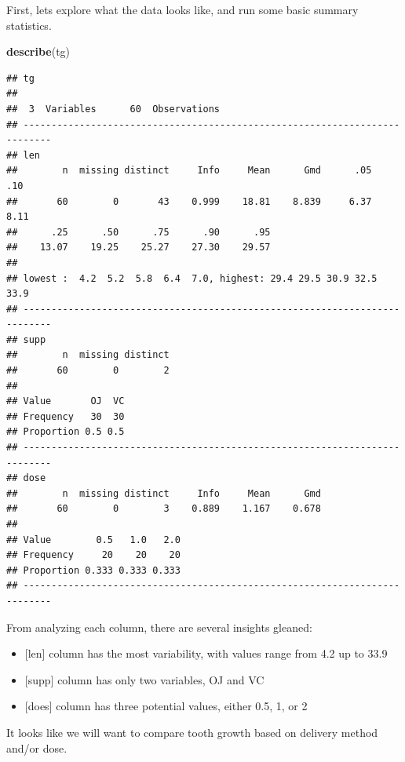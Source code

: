 \documentclass[]{article}
\newenvironment{Shaded}{\begin{snugshade}}{\end{snugshade}}
\newcommand{\KeywordTok}[1]{\textcolor[rgb]{0.13,0.29,0.53}{\textbf{#1}}}
\newcommand{\NormalTok}[1]{#1}
\providecommand{\tightlist}{%
  \setlength{\itemsep}{0pt}\setlength{\parskip}{0pt}}
\begin{document}
First, lets explore what the data looks like, and run some basic summary
statistics.

\begin{Shaded}
\begin{Highlighting}[]
\KeywordTok{describe}\NormalTok{(tg)}
\end{Highlighting}
\end{Shaded}

\begin{verbatim}
## tg 
## 
##  3  Variables      60  Observations
## ---------------------------------------------------------------------------
## len 
##        n  missing distinct     Info     Mean      Gmd      .05      .10 
##       60        0       43    0.999    18.81    8.839     6.37     8.11 
##      .25      .50      .75      .90      .95 
##    13.07    19.25    25.27    27.30    29.57 
## 
## lowest :  4.2  5.2  5.8  6.4  7.0, highest: 29.4 29.5 30.9 32.5 33.9
## ---------------------------------------------------------------------------
## supp 
##        n  missing distinct 
##       60        0        2 
##                   
## Value       OJ  VC
## Frequency   30  30
## Proportion 0.5 0.5
## ---------------------------------------------------------------------------
## dose 
##        n  missing distinct     Info     Mean      Gmd 
##       60        0        3    0.889    1.167    0.678 
##                             
## Value        0.5   1.0   2.0
## Frequency     20    20    20
## Proportion 0.333 0.333 0.333
## ---------------------------------------------------------------------------
\end{verbatim}

From analyzing each column, there are several insights gleaned:

\begin{itemize}
\tightlist
\item
  {[}len{]} column has the most variability, with values range from 4.2
  up to 33.9
\item
  {[}supp{]} column has only two variables, OJ and VC
\item
  {[}does{]} column has three potential values, either 0.5, 1, or 2
\end{itemize}

It looks like we will want to compare tooth growth based on delivery
method and/or dose.
\end{document}
